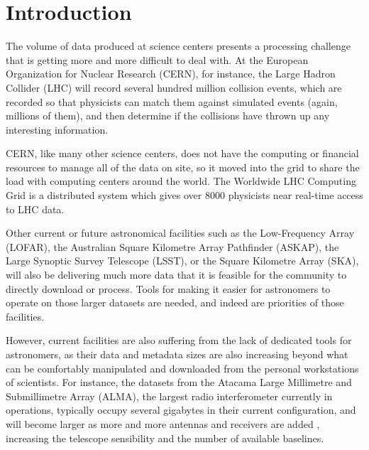\chapter{Introduction}


The volume of data produced at
science centers presents a
processing challenge
that is getting more and more difficult to deal with.
At the European Organization for Nuclear Research
(CERN), for instance,
the Large Hadron Collider (LHC) will record
several hundred million collision events,
which are recorded so that physicists can match them against simulated events (again, millions of them), and then determine if the collisions have thrown up any interesting information.

CERN, like many other science centers, does not have the computing or financial resources to manage all of the data
on site,
so it moved into the grid to share the load with computing centers around the world. The Worldwide LHC Computing Grid is a distributed system which gives over 8000 physicists near real-time access to LHC data.

Other current or future astronomical  facilities such as the Low-Frequency Array (LOFAR), the Australian Square Kilometre Array Pathfinder (ASKAP), the Large Synoptic Survey Telescope (LSST), or the Square Kilometre Array (SKA), will also be delivering much more data that it is feasible for the community to directly download or process. Tools for making
it
easier for astronomers to operate on those larger datasets are needed, and indeed are priorities of those facilities.


However, current facilities are also suffering from the lack of dedicated tools for astronomers, as their data and metadata sizes are also increasing beyond what can be comfortably manipulated and downloaded from the personal workstations of scientists. For instance, the datasets from the Atacama Large Millimetre and Submillimetre Array (ALMA), the largest radio interferometer currently in operations, typically occupy several gigabytes in their current configuration, and will become larger as more and more antennas and receivers are %
added , increasing the telescope sensibility and the number of available baselines.

